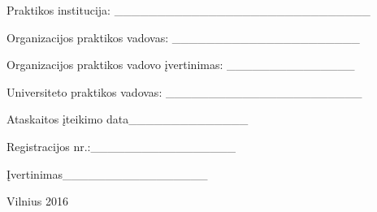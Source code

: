\documentclass[a4paper,12pt]{article}
\begin{document}
\begin{titlepage}
\begin{flushleft}
\vspace{0.3cm}

\textsf{\large{Praktikos institucija}:} \_\_\_\_\_\_\_\_\_\_\_\_\_\_\_\_\_\_\_\_\_\_\_\_\_\_\_\_\_\_
\vspace{-0.8cm}


\vspace{0.3cm}

\textsf{\large{Organizacijos praktikos vadovas}:} \_\_\_\_\_\_\_\_\_\_\_\_\_\_\_\_\_\_\_\_\_\_
\vspace{-0.8cm}

\vspace{0.3cm}

\textsf{\large{Organizacijos praktikos vadovo įvertinimas}:} \_\_\_\_\_\_\_\_\_\_\_\_\_\_\_
\vspace{-0.8cm}

\vspace{0.3cm}

\textsf{\large{Universiteto praktikos vadovas}:} \_\_\_\_\_\_\_\_\_\_\_\_\_\_\_\_\_\_\_\_\_\_\_
\vspace{-0.8cm}


\flushright{\_\_\_\_\_\_\_\_\_\_\_\_\_\_\_\_\_\_\_}
\vspace{-0.4cm}

\end{flushleft}

\vspace{1cm}

\begin{flushright}

\textsf{Ataskaitos įteikimo data}\hspace{0.2cm}\_\_\_\_\_\_\_\_\_\_\_\_\_\_

\textsf{Registracijos nr.:}\hspace{0.5cm}\_\_\_\_\_\_\_\_\_\_\_\_\_\_\_\_\_

\textsf{Įvertinimas}\hspace{1.5cm}\_\_\_\_\_\_\_\_\_\_\_\_\_\_\_\_\_

\vspace{-0.4cm}



\end{flushright}


\vspace{0.5cm}
\textsf{Vilnius 2016}

\end{titlepage}
\end{document}
